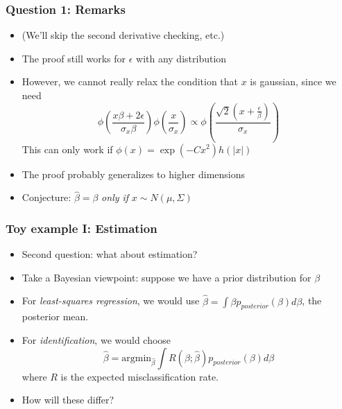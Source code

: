 \documentclass{beamer}
\newcommand{\argmin}{\text{argmin}}
\begin{document}
\begin{frame}
\frametitle{Question 1: Remarks}
\begin{itemize}
\item (We'll skip the second derivative checking, etc.)
\item The proof still works for $\epsilon$ with any distribution
\item However, we cannot really relax the condition that $x$ is gaussian, since we need
\[
\phi\left(\frac{x\beta + 2\epsilon}{\sigma_x \beta}\right)
\phi\left(\frac{x}{\sigma_x}\right) \propto 
\phi\left(\frac{\sqrt{2} (x + \frac{\epsilon}{\beta})}{\sigma_x}\right)
\]
This can only work if $\phi(x) = \exp(-C x^2)h(|x|)$
\item The proof probably generalizes to higher dimensions
\item Conjecture: $\hat{\beta} = \beta$ \emph{only if} $x \sim N(\mu, \Sigma)$
\end{itemize}
\end{frame}

\begin{frame}
\frametitle{Toy example I: Estimation}
\begin{itemize}
\item Second question: what about estimation?
\item Take a Bayesian viewpoint: suppose we have a prior distribution for $\beta$
\item For \emph{least-squares regression}, we would use $\hat{\beta} = \int \beta p_{posterior}(\beta) d\beta$, the posterior mean.
\item For \emph{identification}, we would choose
\[
\hat{\beta} = \argmin_{\hat{\beta}} \int R(\beta; \hat{\beta}) p_{posterior}(\beta) d\beta
\]
where $R$ is the expected misclassification rate.
\item How will these differ?
\end{itemize}
\end{frame}
\end{document}
